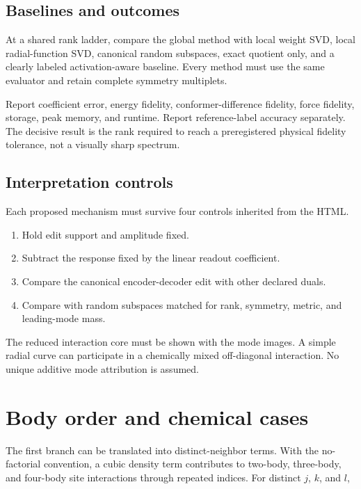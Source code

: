 \documentclass[10pt,twocolumn]{article}
\begin{document}
\subsection{Baselines and outcomes}

At a shared rank ladder, compare the global method with local weight SVD, local radial-function SVD, canonical random subspaces, exact quotient only, and a clearly labeled activation-aware baseline. Every method must use the same evaluator and retain complete symmetry multiplets.

Report coefficient error, energy fidelity, conformer-difference fidelity, force fidelity, storage, peak memory, and runtime. Report reference-label accuracy separately. The decisive result is the rank required to reach a preregistered physical fidelity tolerance, not a visually sharp spectrum.

\subsection{Interpretation controls}

Each proposed mechanism must survive four controls inherited from the HTML.

\begin{enumerate}[leftmargin=1.3em]
\item Hold edit support and amplitude fixed.
\item Subtract the response fixed by the linear readout coefficient.
\item Compare the canonical encoder-decoder edit with other declared duals.
\item Compare with random subspaces matched for rank, symmetry, metric, and leading-mode mass.
\end{enumerate}

The reduced interaction core must be shown with the mode images. A simple radial curve can participate in a chemically mixed off-diagonal interaction. No unique additive mode attribution is assumed.

\section{Body order and chemical cases}

The first branch can be translated into distinct-neighbor terms. With the no-factorial convention, a cubic density term contributes to two-body, three-body, and four-body site interactions through repeated indices. For distinct $j$, $k$, and $l$,
\end{document}
